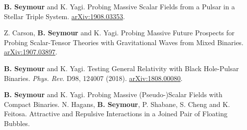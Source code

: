 



\begin{cvpublications}

  \cvpublication
    {\textbf{B. Seymour} and K. Yagi. Probing Massive Scalar Fields from a Pulsar in a Stellar Triple System. \href{https://arxiv.org/abs/1908.03353}{arXiv:1908.03353}. } %
    
  \cvpublication
    {Z. Carson, \textbf{B. Seymour} and K. Yagi. Probing Massive Future Prospects for Probing Scalar-Tensor Theories with Gravitational Waves from Mixed Binaries. \href{https://arxiv.org/abs/1907.03897}{arXiv:1907.03897}. } %

  \cvpublication
    {\textbf{B. Seymour} and K. Yagi. Testing General Relativity with Black Hole-Pulsar Binaries. \textit{Phys. Rev.} D98, 124007 (2018). \href{https://arxiv.org/abs/1808.00080}{arXiv:1808.00080}.} %
    

\end{cvpublications}



\begin{cvpublications}

 
    \cvpublication
    {\textbf{B. Seymour} and K. Yagi. Probing Massive (Pseudo-)Scalar Fields with Compact Binaries.} %
  \cvpublication
    {N. Hagans, \textbf{B. Seymour}, P. Shabane, S. Cheng and K. Feitosa. Attractive and Repulsive Interactions in a Joined Pair of Floating Bubbles.} %

\end{cvpublications}